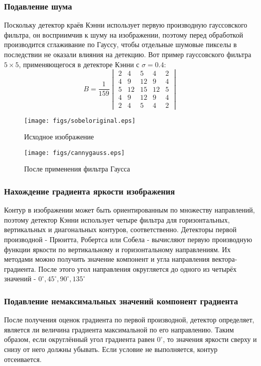 \documentclass[a4paper,12pt]{report}
\begin{document}
\subsubsection{Подавление шума}
Поскольку детектор краёв Кэнни использует первую производную гауссовского фильтра, он восприимчив к шуму на изображении, поэтому перед обработкой производится сглаживание по Гауссу, чтобы отдельные шумовые пикселы в последствии не оказали влияния на детекцию. Вот пример гауссовского фильтра $5\times 5$, применяющегося в детекторе Кэнни с $\sigma=0.4$:
\begin{equation}B=\frac{1}{159}
\begin{vmatrix}2 & 4 & 5 & 4 & 2\\
4 & 9 & 12 & 9 & 4\\
5 & 12 & 15 & 12 & 5 \\
4 & 9 & 12 & 9 & 4\\
2 & 4 & 5 & 4 & 2\end{vmatrix}
\end{equation}

\begin{figure}[!h]
\begin{center}\texttt{[image: figs/sobeloriginal.eps]}
\end{center}
\caption{Исходное изображение}
\label{cannyorig}
\end{figure}
\begin{figure}[!h]
\begin{center}
\texttt{[image: figs/cannygauss.eps]}
\end{center}
\caption{После применения фильтра Гаусса}
\label{cannygauss}
\end{figure}

\subsubsection{Нахождение градиента яркости изображения}
Контур в изображении может быть ориентированным по множеству направлений, поэтому детектор Кэнни использует четыре фильтра для горизонтальных, вертикальных и диагональных контуров, соответственно. Детекторы первой производной - Прюитта, Робертса или Собела - вычисляют первую производную функции яркости по вертикальному и горизонтальному направлениям. Их методами можно получить значение компонент и угла направления вектора-градиента. После этого угол направления округляется до одного из четырёх значений - $0^\circ, 45^\circ, 90^\circ, 135^\circ$

\subsubsection{Подавление немаксимальных значений компонент градиента}
После получения оценок градиента по первой производной, детектор определяет, является ли величина градиента максимальной по его направлению.  Таким образом, если округлённый угол градиента равен $0^\circ$, то значения яркости сверху и снизу от него должны убывать. Если условие не выполняется, контур отсеивается.
\end{document}
